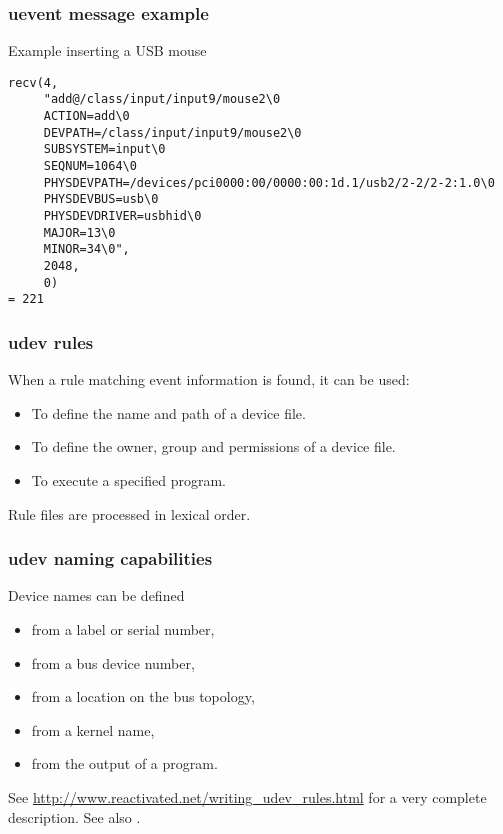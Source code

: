 \begin{frame}[fragile]
  \frametitle{uevent message example}
  Example inserting a USB mouse
  \begin{block}{}
\tiny
\begin{verbatim}
recv(4,
     "add@/class/input/input9/mouse2\0
     ACTION=add\0
     DEVPATH=/class/input/input9/mouse2\0
     SUBSYSTEM=input\0
     SEQNUM=1064\0
     PHYSDEVPATH=/devices/pci0000:00/0000:00:1d.1/usb2/2-2/2-2:1.0\0
     PHYSDEVBUS=usb\0
     PHYSDEVDRIVER=usbhid\0
     MAJOR=13\0
     MINOR=34\0",
     2048,
     0)
= 221
\end{verbatim}
  \end{block}
\end{frame}

\begin{frame}
  \frametitle{udev rules}
  When a  rule matching event information is found, it can be
  used:
  \begin{itemize}
  \item To define the name and path of a device file.
  \item To define the owner, group and permissions of a device file.
  \item To execute a specified program.
  \end{itemize}
  Rule files are processed in lexical order.
\end{frame}

\begin{frame}
  \frametitle{udev naming capabilities}
  Device names can be defined
  \begin{itemize}
  \item from a label or serial number,
  \item from a bus device number,
  \item from a location on the bus topology,
  \item from a kernel name,
  \item from the output of a program.
  \end{itemize}
See \url{http://www.reactivated.net/writing_udev_rules.html}
for a very complete description. See also .
\end{frame}

